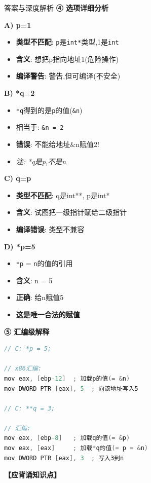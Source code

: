 \documentclass[a4paper,12pt]{article}
\begin{document}
\begin{bluebox}{答案与深度解析}
	\textbf{④ 选项详细分析}

	\textbf{A) p=1}
	\begin{itemize}[leftmargin=*, nosep]
		\item \textbf{类型不匹配}: \texttt{p}是\texttt{int*}类型,1是\texttt{int}
		\item \textbf{含义}: 想把p指向地址1(危险操作)
		\item \textbf{编译警告}: 警告,但可编译(不安全)
	\end{itemize}

	\textbf{B) *q=2}
	\begin{itemize}[leftmargin=*, nosep]
		\item \texttt{*q}得到的是\texttt{p}的值(\texttt{\&n})
		\item 相当于: \texttt{\&n = 2}
		\item \textbf{错误}: 不能给地址\&n赋值2!
		\item \textit{注: *q是p,不是n}
	\end{itemize}

	\textbf{C) q=p}
	\begin{itemize}[leftmargin=*, nosep]
		\item \textbf{类型不匹配}: q是int**, p是int*
		\item \textbf{含义}: 试图把一级指针赋给二级指针
		\item \textbf{编译错误}: 类型不兼容
	\end{itemize}

	\textbf{D) *p=5}
	\begin{itemize}[leftmargin=*, nosep]
		\item \texttt{*p} = \texttt{n}的值的引用
		\item \textbf{含义}: n = 5
		\item \textbf{正确}: 给n赋值5
		\item \textbf{这是唯一合法的赋值}
	\end{itemize}

	\textbf{⑤ 汇编级解释}
	\begin{lstlisting}[language=C]
// C: *p = 5;

// x86汇编:
mov eax, [ebp-12]  ; 加载p的值(= &n)
mov DWORD PTR [eax], 5  ; 向该地址写入5

// C: **q = 3;

// 汇编:
mov eax, [ebp-8]   ; 加载q的值(= &p)
mov eax, [eax]     ; 加载*q的值(= p = &n)
mov DWORD PTR [eax], 3  ; 写入3到n
    \end{lstlisting}

	\textbf{【应背诵知识点】}


\end{bluebox}
\end{document}

